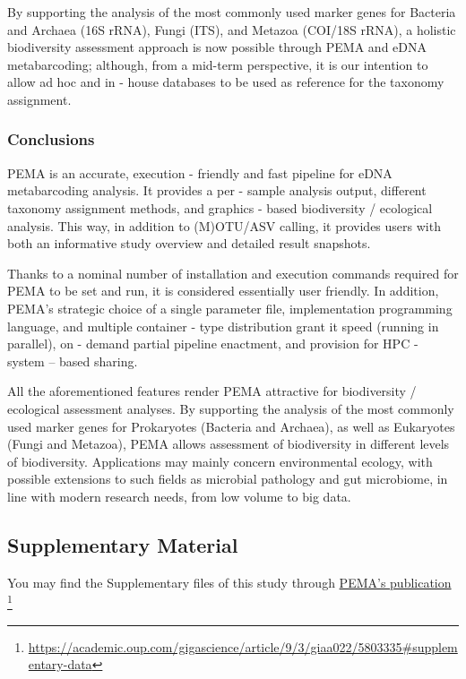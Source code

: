       By supporting the analysis of the most commonly used marker genes for Bacteria and Archaea (16S rRNA), Fungi (ITS), and Metazoa (COI/18S rRNA), a holistic biodiversity assessment approach is now possible through PEMA and eDNA metabarcoding; although, from a mid-term perspective, it is our intention to allow ad hoc and in - house databases to be used as reference for the taxonomy assignment.

   \subsubsection*{Conclusions}
   \label{subsec:pema-conclusion}

      PEMA is an accurate, execution - friendly and fast pipeline for eDNA metabarcoding analysis. 
      It provides a per - sample analysis output, different taxonomy assignment methods, and graphics - based biodiversity / ecological analysis. 
      This way, in addition to (M)OTU/ASV calling, it provides users with both an informative study overview and detailed result snapshots.

      Thanks to a nominal number of installation and execution commands required for PEMA to be set and run, it is considered essentially user friendly. 
      In addition, PEMA's strategic choice of a single parameter file, implementation programming language, and multiple container - type distribution grant it speed (running in parallel), on - demand partial pipeline enactment, and provision for HPC - system – based sharing.

      All the aforementioned features render PEMA attractive for biodiversity / ecological assessment analyses. 
      By supporting the analysis of the most commonly used marker genes for Prokaryotes (Bacteria and Archaea), as well as Eukaryotes (Fungi and Metazoa), PEMA allows assessment of biodiversity in different levels of biodiversity. 
      Applications may mainly concern environmental ecology, with possible extensions to such fields as microbial pathology and gut microbiome, in line with modern research needs, from low volume to big data.

   \subsection{Supplementary Material}

      You may find the Supplementary files of this study through 
      \href{https://academic.oup.com/gigascience/article/9/3/giaa022/5803335#supplementary-data}{PEMA's publication}
      \footnote{\href{https://academic.oup.com/gigascience/article/9/3/giaa022/5803335\#supplementary-data}{https://academic.oup.com/gigascience/article/9/3/giaa022/5803335\#supplementary-data}}


